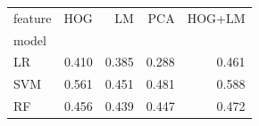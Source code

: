\begin{tabular}{lrrrr}
\toprule
feature & HOG & LM & PCA & HOG+LM \\
model &  &  &  &  \\
\midrule
LR & 0.410 & 0.385 & 0.288 & 0.461 \\
SVM & 0.561 & 0.451 & 0.481 & 0.588 \\
RF & 0.456 & 0.439 & 0.447 & 0.472 \\
\bottomrule
\end{tabular}
